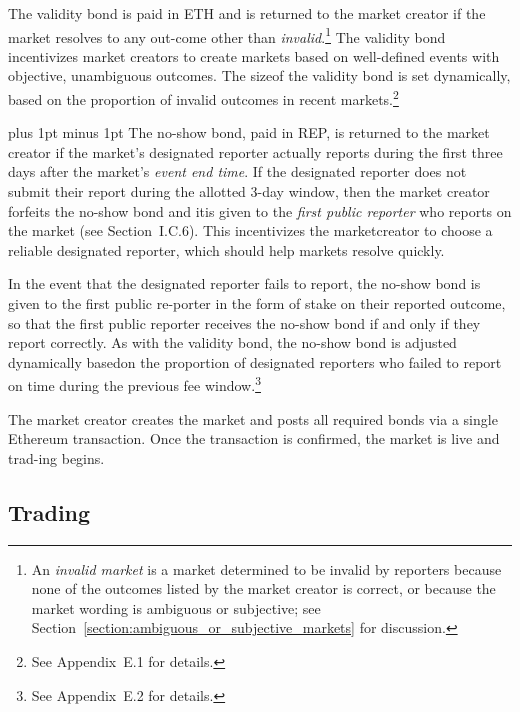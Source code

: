 \documentclass[12pt,floatfix,reprint,nofootinbib,amsmath,amssymb,epsfig,pre,floats,letterpaper,groupedaffiliation]{revtex4-1}
\theoremstyle{definition}
\theoremstyle{definition}
\begin{document}
The validity bond is paid in ETH and is returned to the market creator if the market resolves to any out-\linebreak come other than \textit{invalid}.\footnote{An \textit{invalid market} is a market determined to be invalid by reporters because none of the outcomes listed by the market creator is cor\-rect, or because the market wording is ambiguous or subjective; see Section~\ref{section:ambiguous_or_subjective_markets} for discussion.} The validity bond incentivizes market creators to create markets based on well-defined events with objective, unambiguous outcomes. The size\linebreak of the validity bond is set dynamically, based on the pro\-portion of invalid outcomes in recent markets.\footnote{See Appendix~E.1 for details.}

{\font plus 1pt minus 1pt
The no-show bond, paid in REP, is returned to the market creator if the market's designated reporter actually reports during the first three days after the market's \textit{event end time}. If the designated reporter does not submit their report during the allotted 3-day window, then the market creator forfeits the no-show bond and it\linebreak is given to the \textit{first public reporter} who reports on the market (see Section~I.C.6). This incentivizes the market\linebreak creator to choose a reliable designated reporter, which should help markets resolve quickly.} 

\vspace{\baselineskip}In the event that the designated reporter fails to re\-port, the no-show bond is given to the first public re-\linebreak porter in the form of stake on their reported outcome, so that the first public reporter receives the no-show bond if and only if they report correctly. As with the validity bond, the no-show bond is adjusted dynamically based\linebreak on the proportion of designated reporters who failed to report on time during the previous fee window.\footnote{See Appendix~E.2 for details.}

The market creator creates the market and posts all required bonds via a single Ethereum transaction. Once the transaction is confirmed, the market is live and trad-\linebreak ing begins.

\subsection{Trading}
\end{document}
